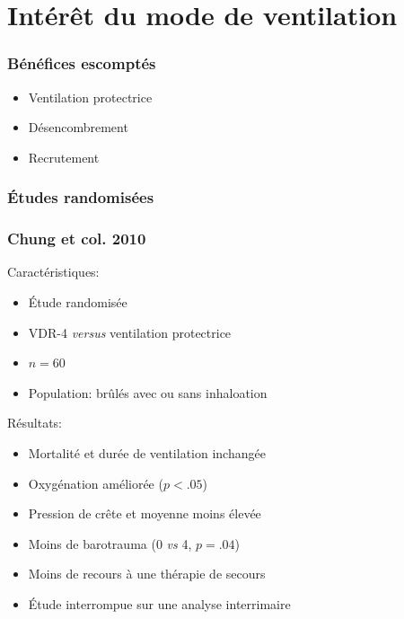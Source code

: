 \documentclass[aspectratio=169]{beamer}
\begin{document}
\section{Intérêt du mode de ventilation}

\begin{frame}
	\frametitle{Bénéfices escomptés}

	\begin{itemize}
		\item Ventilation protectrice
		\item Désencombrement
		\item Recrutement
	\end{itemize}

\end{frame}

\begin{frame}
	\frametitle{Études randomisées}
	
\end{frame}

\begin{frame}
	\frametitle{Chung et col. 2010}

	\begin{block}{Caractéristiques:}

	\begin{itemize}
		\item Étude randomisée
		\item VDR-4 \textit{versus} ventilation protectrice
		\item $n=60$
		\item Population: brûlés avec ou sans inhaloation
	\end{itemize}
	\end{block}

	\begin{block}{Résultats:}

	\begin{itemize}
		\item Mortalité et durée de ventilation inchangée
		\item Oxygénation améliorée ($p < .05$)
		\item Pression de crête et moyenne moins élevée
		\item Moins de barotrauma (0 \textit{vs} 4, $p=.04$)
		\item Moins de recours à une thérapie de secours
		\item Étude interrompue sur une analyse interrimaire
	\end{itemize}
	\end{block}

\end{frame}
\end{document}
